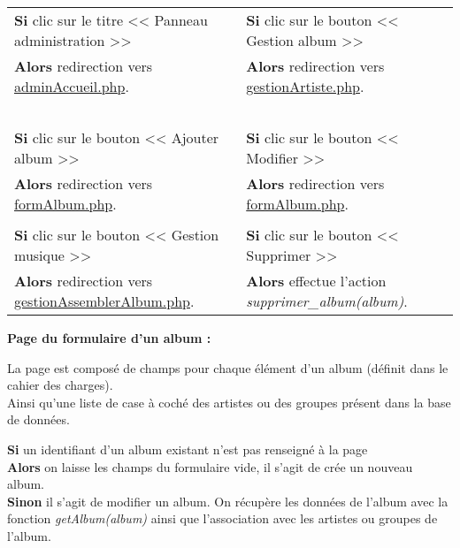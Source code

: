            \begin{center}
                \begin{tabular}{l | l}
                    \textbf{Si} clic sur le titre << Panneau administration >> & \textbf{Si} clic sur le bouton << Gestion album >> \\
                    \textbf{Alors} redirection vers \underline{adminAccueil.php}. & \textbf{Alors} redirection vers \underline{gestionArtiste.php}. \\ \\

                    \textbf{Si} clic sur le bouton << Ajouter album >> & \textbf{Si} clic sur le bouton << Modifier >> \\
                    \textbf{Alors} redirection vers \underline{formAlbum.php}. & \textbf{Alors} redirection vers \underline{formAlbum.php}. \\ \\
                    
                    \textbf{Si} clic sur le bouton << Gestion musique >> & \textbf{Si} clic sur le bouton << Supprimer >> \\
                    \textbf{Alors} redirection vers \underline{gestionAssemblerAlbum.php}. & \textbf{Alors} effectue l'action \emph{supprimer\_album(album)}.
                \end{tabular}
            \end{center}

        \clearpage
            
        
            \begin{paragraphe}
                \textbf{Page du formulaire d'un album :}
            \end{paragraphe}
            
            \begin{paragraphe}
                La page est composé de champs pour chaque élément d'un album (définit dans le cahier des charges). \\
                Ainsi qu'une liste de case à coché des artistes ou des groupes présent dans la base de données.
            \end{paragraphe}

            \begin{paragraphe}
                \textbf{Si} un identifiant d'un album existant n'est pas renseigné à la page \\
                \textbf{Alors} on laisse les champs du formulaire vide, il s'agit de crée un nouveau album. \\
                \textbf{Sinon} il s'agit de modifier un album. On récupère les données de l'album avec la fonction \emph{getAlbum(album)} ainsi que l'association avec les artistes ou groupes de l'album.
            \end{paragraphe}
            
